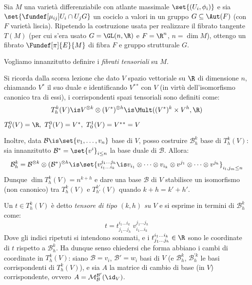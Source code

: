 

\newcommand*\dual{{^\ast}} %
\newcommand*\base[1][B]{\mathcal{#1}} %


Sia $M$ una varietà differenziabile con atlante massimale $\set{(U_i, \phi_i)}$
e sia $\set{ \fundef[\mu_{ij}]{U_i \cap U_j}{G} }$ un cociclo a valori in un gruppo $G \subseteq \Aut(F)$ (con $F$ varietà liscia). Ripetendo la costruzione usata per realizzare il fibrato tangente $T(M)$ (per cui s'era usato $G = \GL(n, \R)$ e $F=\R^n$, $n = \dim M$), ottengo un fibrato $\Fundef[\pi]{E}{M}$ di fibra $F$ e gruppo strutturale $G$.


Vogliamo innanzitutto definire i \emph{fibrati tensoriali} su $M$.

Si ricorda dalla scorsa lezione che dato $V$ spazio vettoriale su $\R$ di dimensione $n$, chiamando $V\dual$ il suo duale e identificando $V \dual \dual$ con $V$ (in virtù dell'isomorfismo canonico tra di essi), i corrispondenti spazi tensoriali sono definiti come: \[
T_h^k(V) \is V^{\otimes k} \otimes (V \dual)^{\otimes h} \is \Mult( (V\dual)^k \times V^h, \R)  \]
\begin{oss}
	$ T_0^0(V) = \R, \ T_1^0(V) = V \dual, \ T_0^1(V) = V \dual \dual = V $
\end{oss}	
Inoltre, data $\base \is \set{v_1, \dots, v_n}$ base di $V$, posso costruire $\base_h^k$ base di $T_h^k(V)$: sia innanzitutto $\base \dual = \set{v^i}_{i \leq n}$ la base duale di $\base$. Allora: \[
\base_h^k = \base ^{\otimes k} \otimes (\base \dual)^{\otimes h} \is
\set{v^{j_1 \dots j_h}_{i_1 \dots i_k} \is v_{i_1} \otimes \dots \otimes v_{i_k} \otimes v^{j_1} \otimes \dots \otimes v^{j_h} } _{i_l, j_m \leq n} \]
Dunque $\dim T_h^k(V) = n^{k+h}$ e dare una base $\base$ di $V$ stabilisce un isomorfismo (non canonico) tra $T_h^k(V)$ e $T_{h'}^{k'}(V)$ quando $k+h = k'+h'$.

Un $t \in T_h^k(V)$ è detto \emph{tensore di tipo $(k, h)$ su $V$} e si esprime in termini di $\base_h^k$ come: \[
t = t_{j_1 \dots j_h}^{i_1 \dots i_k} \  v^{j_1 \dots j_h}_{i_1 \dots i_k} \]
Dove gli indici ripetuti si intendono sommati, e i $t_{j_1 \dots j_h}^{i_1 \dots i_k} \in \R$ sono le coordinate di $t$ rispetto a $\base_h^k$. Ha dunque senso chiedersi che forma abbiano i cambi di coordinate in $T^k_h(V)$: siano $\base={v_i}$, $\base'={w_i}$ basi di $V$ (e $\base_h^k$, $\base_h^{\prime k}$ le basi corrispondenti di $T^k_h(V)$), e sia $A$ la matrice di cambio di base (in $V$) corrispondente, ovvero $A = \mathcal{M}_{\base}^{\base'}(\id_V)$.

